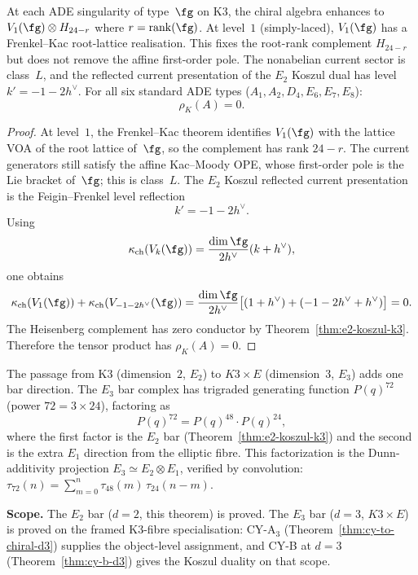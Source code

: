\begin{proposition}
\label{prop:ade-koszul-landscape}
At each ADE singularity of type~$\fg$ on K3, the chiral algebra enhances
to $V_1(\fg) \otimes H_{24-r}$ where $r = \mathrm{rank}(\fg)$. At level~$1$
(simply-laced), $V_1(\fg)$ has a Frenkel--Kac root-lattice realisation.
This fixes the root-rank complement $H_{24-r}$ but does not remove the
affine first-order pole. The nonabelian current sector is class~$L$, and
the reflected current presentation of the $E_2$ Koszul dual has level
$k'=-1-2h^\vee$. For all six standard ADE types
($A_1, A_2, D_4, E_6, E_7, E_8$):
\[
 \rho_K(A) = 0.
\]
\end{proposition}

\begin{proof}
At level~$1$, the Frenkel--Kac theorem identifies $V_1(\fg)$ with the
lattice VOA of the root lattice of~$\fg$, so the complement has rank
$24-r$. The current generators still satisfy the affine Kac--Moody OPE,
whose first-order pole is the Lie bracket of~$\fg$; this is class~$L$.
The $E_2$ Koszul reflected current presentation is the Feigin--Frenkel
level reflection
\[
 k'=-1-2h^\vee.
\]
Using
\[
 \kappa_{\mathrm{ch}}(V_k(\fg))
 =\frac{\dim\fg}{2h^\vee}(k+h^\vee),
\]
one obtains
\[
\kappa_{\mathrm{ch}}(V_1(\fg))
+\kappa_{\mathrm{ch}}(V_{-1-2h^\vee}(\fg))
=\frac{\dim\fg}{2h^\vee}\bigl[(1+h^\vee)+(-1-2h^\vee+h^\vee)\bigr]=0.
\]
The Heisenberg complement has zero conductor by
Theorem~\ref{thm:e2-koszul-k3}. Therefore the tensor product has
$\rho_K(A)=0$.
\end{proof}

\begin{remark}
\label{rem:e2-to-e3-k3}
The passage from K3 (dimension~$2$, $E_2$) to $K3 \times E$ (dimension~$3$,
$E_3$) adds one bar direction. The $E_3$ bar complex has trigraded
generating function $P(q)^{72}$ (power $72 = 3 \times 24$), factoring as
\[
 P(q)^{72} = P(q)^{48} \cdot P(q)^{24},
\]
where the first factor is the $E_2$ bar
(Theorem~\ref{thm:e2-koszul-k3}) and the second is the extra $E_1$
direction from the elliptic fibre. This factorization is the
Dunn-additivity projection $E_3 \simeq E_2 \otimes E_1$, verified by
convolution:
$\tau_{72}(n) = \sum_{m=0}^{n} \tau_{48}(m) \, \tau_{24}(n-m)$.

\textbf{Scope.} The $E_2$ bar ($d = 2$, this theorem) is proved.
The $E_3$ bar ($d = 3$, $K3 \times E$) is proved on the framed
K3-fibre specialisation: CY-A$_3$ (Theorem~\ref{thm:cy-to-chiral-d3})
supplies the object-level assignment, and CY-B at $d = 3$
(Theorem~\ref{thm:cy-b-d3}) gives the Koszul duality on that scope.
\end{remark}

